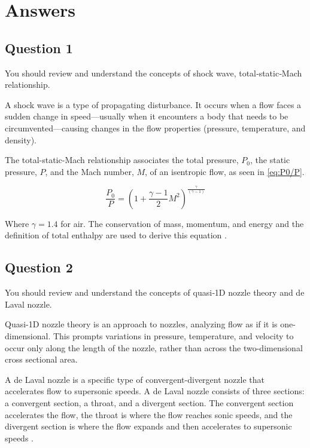 \chapter{Answers}
\label{cp:answers}
\section{Question 1}
\begin{importantbox}
    You should review and understand the concepts of shock wave, total‐static‐Mach relationship.
\end{importantbox}

A shock wave is a type of propagating disturbance. It occurs when a flow faces a sudden change in speed—usually when it encounters a body that needs to be circumvented—causing changes in the flow properties (pressure, temperature, and density).

The total-static-Mach relationship associates the total pressure, $P_0$, the static pressure, $P$, and the Mach number, $M$, of an isentropic flow, as seen in \autoref{eq:P0/P}. 

\begin{equation} \label{eq:P0/P}
  \frac{P_0}{P} = \left(1 + \frac{\gamma - 1}{2}M^2\right)^\frac{\gamma}{(\gamma - 1)}
\end{equation}

\noindent{}Where $\gamma = 1.4$ for air. The conservation of mass, momentum, and energy and the definition of total enthalpy are used to derive this equation \citep{Benson_2021}.

\section{Question 2}
\begin{importantbox}
    You should review and understand the concepts of quasi‐1D nozzle theory and de Laval nozzle.
\end{importantbox}

Quasi-1D nozzle theory is an approach to nozzles, analyzing flow as if it is one-dimensional. This prompts variations in pressure, temperature, and velocity to occur only along the length of the nozzle, rather than across the two-dimensional cross sectional area.

A de Laval nozzle is a specific type of convergent-divergent nozzle that accelerates flow to supersonic speeds. A de Laval nozzle consists of three sections: a convergent section, a throat, and a divergent section. The convergent section accelerates the flow, the throat is where the flow reaches sonic speeds, and the divergent section is where the flow expands and then accelerates to supersonic speeds \citep{Anderson_2016}.

